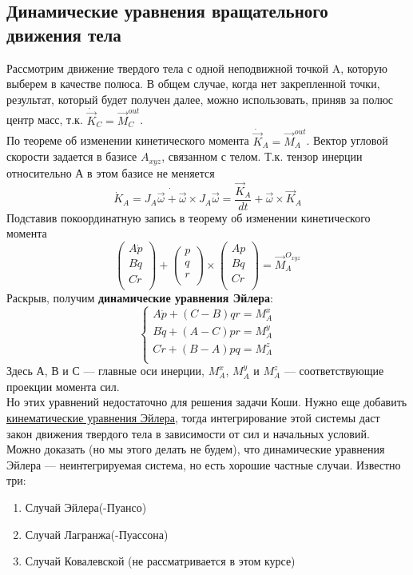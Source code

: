 \subsection{Динамические уравнения вращательного движения тела}
Рассмотрим движение твердого тела с одной неподвижной точкой A, которую выберем в качестве полюса. В общем случае, когда нет закрепленной точки, результат, который будет получен далее, можно использовать, приняв за полюс центр масс, т.к. $\dot{\vec{K}}_C = \vec{M}_C^{out}$.\\

По теореме об изменении кинетического момента $\dot{\vec{K}}_A = \vec{M}_A^{out}$. Вектор угловой скорости задается в базисе $A_{xyz}$, связанном с телом. Т.к. тензор инерции относительно А в этом базисе не меняется
\[
\dot{K}_A = J_A\dot{\vec{\omega} + \vec{\omega}} \times J_A\vec{\omega} = \dfrac{\vec{K}_A}{d t} + \vec{\omega} \times \vec{K}_A
\]
Подставив покоординатную запись в теорему об изменении кинетического момента
\[
\begin{pmatrix}
    A\dot{p}\\B\dot{q}\\C\dot{r}\\
\end{pmatrix} + \begin{pmatrix}
    p\\q\\r\\
\end{pmatrix}\times\begin{pmatrix}
    Ap\\Bq\\Cr\\
\end{pmatrix} = \vec{M}_A^{O_{xyz}}
\]
 Раскрыв, получим \textbf{динамические уравнения Эйлера}:
 \[
 \begin{cases}
     A\dot{p} + (C - B) qr = M_A^x\\
     B\dot{q} + (A - C) pr = M_A^y\\
     C\dot{r} + (B - A) pq = M_A^z\\
 \end{cases}
 \]
 Здесь А, В и С --- главные оси инерции, $M_A^x$, $M_A^y$ и $M_A^z$ --- соответствующие проекции момента сил.\\

 Но этих уравнений недостаточно для решения задачи Коши. Нужно еще добавить \hyperlink{kinematic_Euler_equations}{кинематические уравнения Эйлера}, тогда интегрирование этой системы даст закон движения твердого тела в зависимости от сил и начальных условий.\\

 Можно доказать (но мы этого делать не будем), что динамические уравнения Эйлера --- неинтегрируемая система, но есть хорошие частные случаи. Известно три:
 \begin{enumerate}
     \item Случай Эйлера(-Пуансо)
     \item Случай Лагранжа(-Пуассона)
     \item Случай Ковалевской (не рассматривается в этом курсе)
 \end{enumerate}